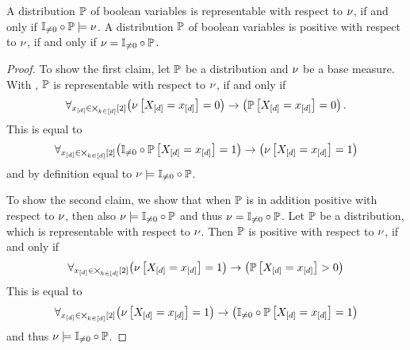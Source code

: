 \begin{theorem}\label{the:minimalRepPosBaseMeasure}
	A distribution $\mathbb{P}$ of boolean variables is representable with respect to $\nu$, if and only if $\mathbb{I}_{\neq0}\circ\mathbb{P}\models\nu$.
	A distribution $\mathbb{P}$ of boolean variables is positive with respect to $\nu$, if and only if $\nu=\mathbb{I}_{\neq0}\circ\mathbb{P}$.
\end{theorem}
\begin{proof}
	To show the first claim, let $\mathbb{P}$ be a distribution and $\nu$ be a base measure.
	With , $\mathbb{P}$ is representable with respect to $\nu$, if and only if
		\[ \forall_{x_{[d]}\in\bigtimes_{k\in[d]}[2]} \big(\nu\left[X_{[d]}=x_{[d]}\right]=0\big) \rightarrow \big(\mathbb{P}\left[X_{[d]}=x_{[d]}\right]=0\big) \, .  \]
	This is equal to
		\[ \forall_{x_{[d]}\in\bigtimes_{k\in[d]}[2]} \big(\mathbb{I}_{\neq0}\circ\mathbb{P}\left[X_{[d]}=x_{[d]}\right]=1\big) \rightarrow \big(\nu\left[X_{[d]}=x_{[d]}\right]=1\big)    \]
	and by definition  equal to $\nu\models\mathbb{I}_{\neq0}\circ\mathbb{P}$.
	
	To show the second claim, we show that when $\mathbb{P}$ is in addition positive with respect to $\nu$, then also $\nu\models\mathbb{I}_{\neq0}\circ\mathbb{P}$ and thus $\nu=\mathbb{I}_{\neq0}\circ\mathbb{P}$.
	Let $\mathbb{P}$ be a distribution, which is representable with respect to $\nu$.
	Then $\mathbb{P}$ is positive with respect to $\nu$, if and only if
		\[ \forall_{x_{[d]}\in\bigtimes_{k\in[d]}[2]} \big(\nu\left[X_{[d]}=x_{[d]}\right]=1\big) \rightarrow \big(\mathbb{P}\left[X_{[d]}=x_{[d]}\right]>0\big)   \]
	This is equal to
		\[ \forall_{x_{[d]}\in\bigtimes_{k\in[d]}[2]} \big(\nu\left[X_{[d]}=x_{[d]}\right]=1\big) \rightarrow \big(\mathbb{I}_{\neq0}\circ\mathbb{P}\left[X_{[d]}=x_{[d]}\right]=1\big)   \]
	and thus $\nu\models\mathbb{I}_{\neq0}\circ\mathbb{P}$.
\end{proof}






